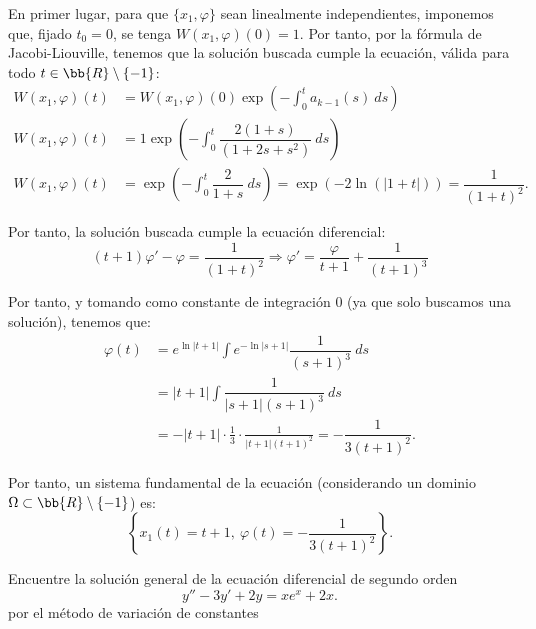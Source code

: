 \documentclass[12pt]{article}
\begin{document}
\begin{ejercicio}
\begin{enumerate}
        En primer lugar, para que $\{x_1,\varphi\}$ sean linealmente independientes, imponemos que, fijado $t_0=0$, se tenga $W(x_1,\varphi)(0)=1$.        
        Por tanto, por la fórmula de Jacobi-Liouville, tenemos que la solución buscada cumple la ecuación, válida para todo $t\in\bb{R}\setminus \{-1\}$:
        \begin{align*}
            W(x_1,\varphi)(t)&=W(x_1,\varphi)(0)\exp\left(-\int_0^t a_{k-1}(s)\ ds\right)\\
            W(x_1,\varphi)(t)&=1\exp\left(-\int_0^t \dfrac{2(1+s)}{(1+2s+s^2)}\ ds\right)\\
            W(x_1,\varphi)(t)&=\exp\left(-\int_0^t \dfrac{2}{1+s}\ ds\right)
            = \exp\left(-2\ln(|1+t|)\right)=\dfrac{1}{(1+t)^2}.
        \end{align*}

        Por tanto, la solución buscada cumple la ecuación diferencial:
        \begin{equation*}
            (t+1)\varphi'-\varphi=\dfrac{1}{(1+t)^2}
            \Longrightarrow
            \varphi'=\dfrac{\varphi}{t+1}+\dfrac{1}{(t+1)^3}
        \end{equation*}

        Por tanto, y tomando como constante de integración $0$ (ya que solo buscamos una solución), tenemos que:
        \begin{align*}
            \varphi(t)&=e^{\ln|t+1|}\int e^{-\ln|s+1|}\dfrac{1}{(s+1)^3}\ ds\\
            &= |t+1|\int \dfrac{1}{|s+1|(s+1)^3}\ ds \\
            &= -|t+1|\cdot \frac{1}{3}\cdot \frac{1}{|t+1|(t+1)^2}
            = -\dfrac{1}{3(t+1)^2}.
        \end{align*}

        Por tanto, un sistema fundamental de la ecuación (considerando un dominio $\Omega\subset \bb{R}\setminus \{-1\}$) es:
        \begin{equation*}
            \left\{x_1(t)=t+1,\ \varphi(t)=-\dfrac{1}{3(t+1)^2}\right\}.
        \end{equation*}
    \end{enumerate}
    \end{ejercicio}

    \begin{ejercicio}
        Encuentre la solución general de la ecuación diferencial de segundo orden
        \begin{equation*}
            y''-3y'+2y=xe^x +2x.
        \end{equation*}
        por el método de variación de constantes
    \end{ejercicio}
\end{document}
